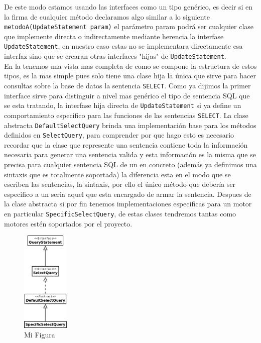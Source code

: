 De este modo estamos usando las interfaces como un tipo genérico, es decir si en la firma de cualquier método declaramos algo similar a lo siguiente \verb=metodoA(UpdateStatement param)= el parámetro param podrá ser cualquier clase que implemente directa o indirectamente mediante herencia la interfase \verb=UpdateStatement=, en nuestro caso estas no se implementara directamente esa interfaz sino que se crearan otras interfaces "hijas" de \verb=UpdateStatement=.\\
En la  tenemos una vista mas completa de como se compone la estructura de estos tipos, es la mas simple pues solo tiene una clase hija la única que sirve para hacer consultas sobre la base de datos la sentencia \verb=SELECT=. Como ya dijimos la primer interface sirve para distinguir a nivel mas genérico el tipo de sentencia SQL que se esta tratando, la interfase hija directa de \verb=UpdateStatement= si ya define un comportamiento especifico para las funciones de las sentencias \verb=SELECT=. La clase abstracta \verb=DefaultSelectQuery= brinda una implementación base para los métodos definidos en \verb=SelectQuery=, para comprender por que hago esto es necesario recordar que la clase que represente una sentencia contiene toda la información necesaria para generar una sentencia valida y esta información es la misma que se precisa para cualquier sentencia SQL de un \dd en concreto (además ya definimos una sintaxis que es totalmente soportada) la diferencia esta en el modo que se escriben las sentencias, la sintaxis, por ello el único método que debería ser especifico a un \dd seria aquel que esta encargado de armar la sentencia. Despues de la clase abstracta si por fin tenemos implementaciones especificas para un motor en particular \verb=SpecificSelectQuery=, de estas clases tendremos tantas como motores estén soportados por el proyecto.    

\begin{figure}
  \centering
    \includegraphics[width=0.2\textwidth]{figuras/crossdb-query.png}
  \caption{Mi Figura}
  \label{fig:query}
\end{figure}


